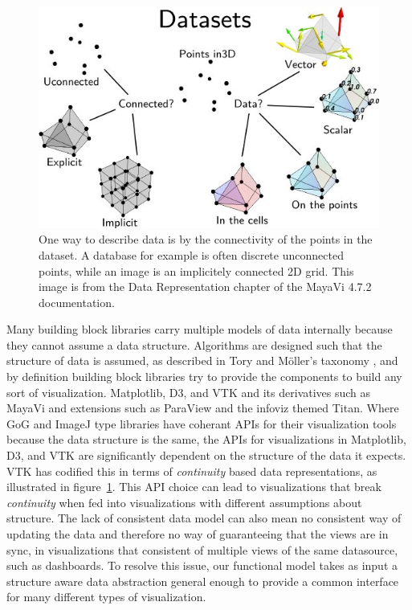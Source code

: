 \documentclass[../main.tex]{subfiles}
\begin{document}
\begin{figure}[H]
    \includegraphics[width=1\textwidth]{figures/intro/dataset_diagram.png}
    \caption{One way to describe data is by the connectivity of the points in the dataset. A database for example is often discrete unconnected points, while an image is an implicitely connected 2D grid. This image is from the Data Representation chapter of the MayaVi 4.7.2 documentation.\cite{DataRepresentationMayavi}}
    \label{fig:intro:data:format}
\end{figure}
Many building block libraries carry multiple models of data internally because they cannot assume a data structure. Algorithms are designed such that the structure of data is assumed, as described in Tory and Möller's taxonomy \cite{ToryRethinkingVisualization2004}, and by definition building block libraries try to  provide the components to build any sort of visualization. Matplotlib, D3\cite{bostockDataDrivenDocuments2011}, and VTK \cite{hanwellVisualizationToolkitVTK2015,geveci2012vtk} and its derivatives such as MayaVi\cite{RamachandranMayaVI2011} and extensions such as ParaView\cite{ahrens2005paraview} and the infoviz themed Titan\cite{brianwylieUnifiedToolkitInformation2009}. Where GoG and ImageJ type libraries have coherant APIs for their visualization tools because the data structure is the same, the APIs for visualizations in Matplotlib, D3, and VTK are significantly dependent on the structure of the data it expects. VTK has codified this in terms of \textit{continuity} based data representations, as illustrated in figure~\ref{fig:intro:data:format}. This API choice can lead to visualizations that break \textit{continuity} when fed into visualizations with different assumptions about structure. The lack of consistent data model can also mean no consistent way of updating the data and therefore no way of guaranteeing that the views are in sync, in visualizations that consistent of multiple views of the same datasource, such as dashboards\cite{a.sarikayaWhatWeTalk2019,fewDashboardConfusionRevisited2007}. To resolve this issue, our functional model takes as input a structure aware data abstraction general enough to provide a common interface for many different types of visualization.
\end{document}
